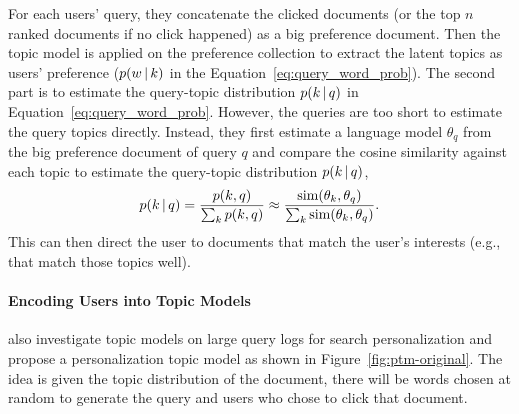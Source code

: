 For each users' query, they concatenate the clicked documents (or the
top $n$ ranked documents if no click happened) as a big preference
document. Then the topic model \plsa{} is applied on the preference
collection to extract the latent topics as users' preference ($p(w \, | \, k)$
in the Equation~\ref{eq:query_word_prob}). The second part is to
estimate the query-topic distribution $p(k \, | \, q)$ in
Equation~\ref{eq:query_word_prob}. However, the queries are too short
to estimate the query topics directly. Instead, they first estimate a
language model $\theta_q$ from the big preference document of query
$q$ and compare the cosine similarity against each topic to estimate
the query-topic distribution $p(k \, | \, q)$,
\begin{align}
p(k \, | \, q) = \frac{p(k, q)}{\sum_k p(k, q)} \approx \frac{\text{sim}(\theta_k, \theta_q)}{\sum_k \text{sim}(\theta_k, \theta_q)}.
\end{align}
This can then direct the user to documents that match the user's
interests (e.g., that match those topics well).

\paragraph{Encoding Users into Topic Models}

\citet{Carman-2010} also investigate topic models on large query logs
for search personalization and propose a personalization topic model
as shown in Figure~\ref{fig:ptm-original}. The idea is given the topic
distribution of the document, there will be words chosen
at random to generate the query and users who chose to
click that document.


